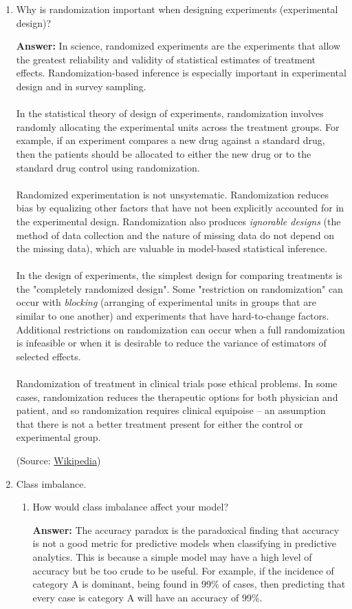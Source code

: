 \documentclass{article}
\newenvironment{QandA}{\begin{enumerate}[label=\arabic*.]}{\end{enumerate}}
\newenvironment{InnerQandA}{\begin{enumerate}[label=\roman*.]}{\end{enumerate}}
\newenvironment{answer}{\par\normalfont \textbf{Answer:}}{}
\begin{document}
\begin{QandA}
    \item Why is randomization important when designing experiments (experimental design)?
    \begin{answer}
        In science, randomized experiments are the experiments that allow the greatest reliability and validity of statistical estimates of treatment effects. Randomization-based inference is especially important in experimental design and in survey sampling. \\\\
        In the statistical theory of design of experiments, randomization involves randomly allocating the experimental units across the treatment groups. For example, if an experiment compares a new drug against a standard drug, then the patients should be allocated to either the new drug or to the standard drug control using randomization.\\\\
        Randomized experimentation is not unsystematic. Randomization reduces bias by equalizing other factors that have not been explicitly accounted for in the experimental design. Randomization also produces \textit{ignorable designs} (the method of data collection and the nature of missing data do not depend on the missing data), which are valuable in model-based statistical inference. \\\\
        In the design of experiments, the simplest design for comparing treatments is the "completely randomized design". Some "restriction on randomization" can occur with \textit{blocking} (arranging of experimental units in groups that are similar to one another) and experiments that have hard-to-change factors. Additional restrictions on randomization can occur when a full randomization is infeasible or when it is desirable to reduce the variance of estimators of selected effects. \\\\
        Randomization of treatment in clinical trials pose ethical problems. In some cases, randomization reduces the therapeutic options for both physician and patient, and so randomization requires clinical equipoise -- an assumption that there is not a better treatment present for either the control or experimental group.

        (Source: \href{https://en.wikipedia.org/wiki/Randomized_experiment}{Wikipedia})
    \end{answer}

    \item Class imbalance.
    \begin{InnerQandA}
        \item How would class imbalance affect your model?
        \begin{answer}
            The accuracy paradox is the paradoxical finding that accuracy is not a good metric for predictive models when classifying in predictive analytics. This is because a simple model may have a high level of accuracy but be too crude to be useful. For example, if the incidence of category A is dominant, being found in 99\% of cases, then predicting that every case is category A will have an accuracy of 99\%.


\end{answer}
\end{InnerQandA}
\end{QandA}
\end{document}
